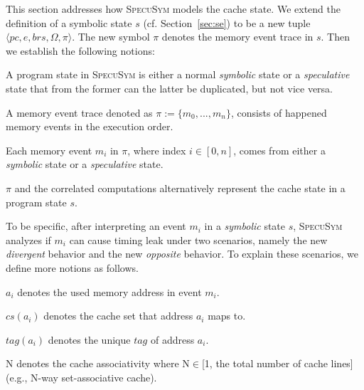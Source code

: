 \documentclass[sigconf]{acmart}
\newcommand\ignore[1]{}
\newcommand{\pcon}{\mathit{pc}}
\newcommand{\SpecuSym}{\textsc{SpecuSym} }
\begin{document}
This section addresses how \SpecuSym models the cache state. We extend the 
definition of a symbolic state $s$ (cf. Section~\ref{sec:se}) to be a new 
tuple $\langle \pcon, \mathit{e}, \mathit{brs},\Omega,\pi\rangle$. The new 
symbol $\pi$ denotes the memory event trace in $s$. Then we establish the 
following notions:
%
%
\begin{itemize*}
  \item A program state in \SpecuSym is either a normal \textit{symbolic} state 
	or a \textit{speculative} state that from the former can the latter be 
	duplicated, but not vice versa. 
  \item A memory event trace denoted as $\pi:=\mathit{\{m_0,...,m_n\}}$, 
    consists of happened memory events in the execution order.
  \item Each memory event $\mathit{m_i}$ in $\pi$, where index $i\in [0,n]$, 
	comes from either a \textit{symbolic} state or a \textit{speculative} state.
  \item $\pi$ and the correlated computations alternatively represent the cache 
	state in a program state $s$.
\end{itemize*}
%
%
\ignore{
On modeling the cache state, exsiting tools such as CaSym~\cite{BrotzmanLZTK2018} 
maintains and updates cache mappings during symbolic execution; others like 
Chalice~\cite{ChattopadhyayBRZ17} and \textsc{SymSC}~\cite{GuoWW18} uses 
offline constraint solving to to reason about the cache behaviors of memory 
accesses upon concrete cache models. To better coordinate the speculative 
modeling component, \SpecuSym adopts an on-the-fly analysis.
}

To be specific, after interpreting an event $m_i$ in a \textit{symbolic} 
state $s$, \SpecuSym analyzes if $\mathit{m_i}$ can cause timing leak 
under two scenarios, namely the new \textit{divergent} behavior and the 
new \textit{opposite} behavior. To explain these scenarios, we define 
more notions as follows.
%
%
\begin{itemize*}
  \item $\mathit{a_i}$ denotes the used memory address in event $\mathit{m_i}$.
  \item $\mathit{cs(a_i)}$ denotes the cache set that address $\mathit{a_i}$ maps to.
  \item $\mathit{tag(a_i)}$ denotes the unique $\mathit{tag}$ of address $\mathit{a_i}$.
  \item {N} denotes the cache associativity where N$\in$[1, the total number of cache lines] (e.g., N-way set-associative cache). 
\end{itemize*}
%
%
\end{document}
